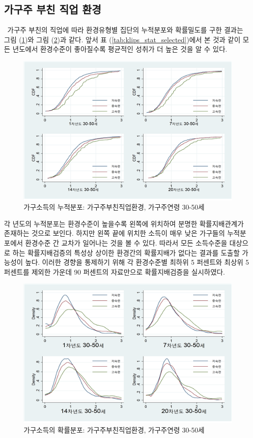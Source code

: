 \subsection{가구주 부친 직업 환경}
 가구주 부친의 직업에 따라 환경유형별 집단의 누적분포와 확률밀도를 구한 결과는 그림 (\ref{fig:klips_cdf4_byedu})와 그림 (\ref{fig:klips_pdf4_byedu})과 같다. 앞서 표 (\ref{tab:klips_stat_selected})에서 본 것과 같이 모든 년도에서 환경수준이 좋아질수록 평균적인 성취가 더 높은 것을 알 수 있다. 
 
\begin{figure}[htbp]
    \centering
    \includegraphics[scale=.7]{figure/klips_cdf4_byedu.png}
    \caption{가구소득의 누적분포: 가구주부친직업환경, 가구주연령 30-50세}
    \label{fig:klips_cdf4_byedu}
\end{figure}

각 년도의 누적분포는 환경수준이 높을수록 왼쪽에 위치하여 분명한 확률지배관계가 존재하는 것으로 보인다.
하지만 왼쪽 끝에 위치한 소득이 매우 낮은 가구들의 누적분포에서 환경수준 간 교차가 일어나는 것을 볼 수 있다.
따라서 모든 소득수준을 대상으로 하는 확률지배검증의 특성상 상이한 환경간의 확률지배가 없다는 결과를 도출할 가능성이 높다.
이러한 경향을 통제하기 위해 각 환경수준별 최하위 5 퍼센트와 최상위 5퍼센트를 제외한 가운데 90 퍼센트의 자료만으로 확률지배검증을 실시하였다.
 
\begin{figure}
    \centering
    \includegraphics[scale=.7]{figure/klips_pdf4_byedu.png}
    \caption{가구소득의 확률분포: 가구주부친직업환경, 가구주연령 30-50세}
    \label{fig:klips_pdf4_byedu}
\end{figure}


